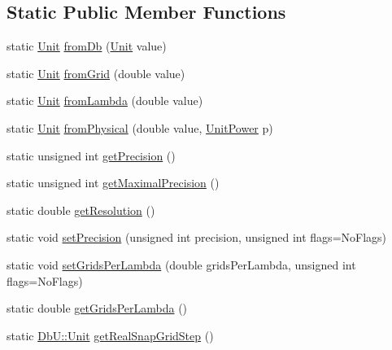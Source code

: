 \subsection*{Static Public Member Functions}
\begin{DoxyCompactItemize}
\item 
static \mbox{\hyperlink{group__DbUGroup_ga4fbfa3e8c89347af76c9628ea06c4146}{Unit}} \mbox{\hyperlink{group__DbUGroup_gaec69d65ec1651c2feea24c5931f4580b}{from\+Db}} (\mbox{\hyperlink{group__DbUGroup_ga4fbfa3e8c89347af76c9628ea06c4146}{Unit}} value)
\item 
static \mbox{\hyperlink{group__DbUGroup_ga4fbfa3e8c89347af76c9628ea06c4146}{Unit}} \mbox{\hyperlink{group__DbUGroup_ga367e1d1b5ac1df076745550cba8a83c1}{from\+Grid}} (double value)
\item 
static \mbox{\hyperlink{group__DbUGroup_ga4fbfa3e8c89347af76c9628ea06c4146}{Unit}} \mbox{\hyperlink{group__DbUGroup_ga4b570755b19ea9ff0f2f258a221bd935}{from\+Lambda}} (double value)
\item 
static \mbox{\hyperlink{group__DbUGroup_ga4fbfa3e8c89347af76c9628ea06c4146}{Unit}} \mbox{\hyperlink{group__DbUGroup_ga11d4dbd9134a19bda35cbacde1cb2769}{from\+Physical}} (double value, \mbox{\hyperlink{group__DbUGroup_ga50b5785bf4d75026c4c112caec3040a7}{Unit\+Power}} p)
\item 
static unsigned int \mbox{\hyperlink{group__DbUGroup_ga6169efbdd9b3d54a0bd8467c8f957fda}{get\+Precision}} ()
\item 
static unsigned int \mbox{\hyperlink{group__DbUGroup_ga8756c9f0a32af5f601cd150e73b02c03}{get\+Maximal\+Precision}} ()
\item 
static double \mbox{\hyperlink{group__DbUGroup_ga120a60b09b344d01c583567a1e489d9e}{get\+Resolution}} ()
\item 
static void \mbox{\hyperlink{group__DbUGroup_gace9a8644e7e80dcaed2a8a95deeb1622}{set\+Precision}} (unsigned int precision, unsigned int flags=No\+Flags)
\item 
static void \mbox{\hyperlink{group__DbUGroup_gac93f9ba2a09105227e34bd05bcb1500c}{set\+Grids\+Per\+Lambda}} (double grids\+Per\+Lambda, unsigned int flags=No\+Flags)
\item 
static double \mbox{\hyperlink{group__DbUGroup_ga9a0359adbfafc356326f5c6adf57ff04}{get\+Grids\+Per\+Lambda}} ()
\item 
static \mbox{\hyperlink{group__DbUGroup_ga4fbfa3e8c89347af76c9628ea06c4146}{Db\+U\+::\+Unit}} \mbox{\hyperlink{group__DbUGroup_ga09e46fcca6aaca94851adfa196e10170}{get\+Real\+Snap\+Grid\+Step}} ()

\end{DoxyCompactItemize}

